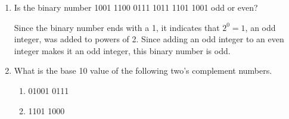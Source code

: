 \documentclass[12pt]{article}
\begin{document}
\begin{enumerate}
    And converting the decimals to binary,
    \begin{align*}
      74 &= \intlongdivision{74}{2}\quad
      \intlongdivision{37}{2}\quad
      \intlongdivision{18}{2}\quad
      \intlongdivision{9}{2}\quad
      \intlongdivision{4}{2}\quad
      \intlongdivision{2}{2}\quad
      \intlongdivision{1}{2}\\
      &\Rightarrow (0100 \ 1010)_2 \\
      97 &= (0110 \ 0001)_2 \ \text{(from part 1B)} \\
      118 &= \intlongdivision{118}{2}\quad
      \intlongdivision{59}{2}\quad
      \intlongdivision{29}{2}\quad
      \intlongdivision{14}{2}\quad
      \intlongdivision{7}{2}\quad
      \intlongdivision{3}{2}\quad
      \intlongdivision{1}{2}\\
      &\Rightarrow (0111 \ 0110)_2 \\
      46 &= \intlongdivision{46}{2}\quad
      \intlongdivision{23}{2}\quad
      \intlongdivision{11}{2}\quad
      \intlongdivision{5}{2}\quad
      \intlongdivision{2}{2}\quad
      \intlongdivision{1}{2}\\
      &\Rightarrow (0010 \ 1110)_2 \\
      50 &= \intlongdivision{50}{2}\quad
      \intlongdivision{25}{2}\quad
      \intlongdivision{12}{2}\quad
      \intlongdivision{6}{2}\quad
      \intlongdivision{3}{2}\quad
      \intlongdivision{1}{2}\\
      &\Rightarrow (0011 \ 0010)_2 \\
    \end{align*}
    Therefore, the ASCII string ``Java.2'' converted to binary is
    \begin{equation*}
      (01001010 \ 01100001 \ 01110110 \ 01100001 \ 00101110 \ 00110010)_2
    \end{equation*}

    \item Is the binary number 1001 1100 0111 1011 1101 1001 odd or even?

    Since the binary number ends with a 1, it indicates that $2^0=1$, an odd integer, was added to powers of 2. Since adding an odd integer to an even integer makes it an odd integer, this binary number is odd.

    \item What is the base 10 value of the following two’s complement numbers.
    \begin{enumerate}
      \item 01001 0111
      \item 1101 1000
    \end{enumerate}


\end{enumerate}
\end{document}
